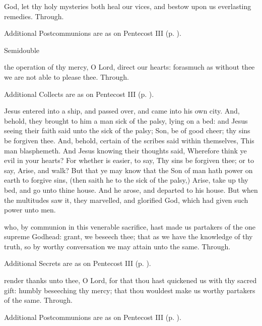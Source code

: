 \postcommunion
{} God, let thy holy mysteries both heal our vices, and bestow upon us everlasting remedies. Through.
\begin{rubric}
    Additional Postcommunions are as on Pentecost III (p. \pageref{PentecostIII}).
\end{rubric}

\begin{inhead}
{Semidouble}
\end{inhead}

\collect
{} the operation of thy mercy, O Lord, direct our hearts: forasmuch as without thee we are not able to please thee. Through.
\begin{rubric}
    Additional Collects are as on Pentecost III (p. \pageref{PentecostIII}).
\end{rubric}

 Jesus entered into a ship, and passed over, and came into his own city. And, behold, they brought to him a man sick of the palsy, lying on a bed: and Jesus seeing their faith said unto the sick of the palsy; Son, be of good cheer; thy sins be forgiven thee. And, behold, certain of the scribes said within themselves, This man blasphemeth. And Jesus knowing their thoughts said, Wherefore think ye evil in your hearts? For whether is easier, to say, Thy sins be forgiven thee; or to say, Arise, and walk? But that ye may know that the Son of man hath power on earth to forgive sins, (then saith he to the sick of the palsy,) Arise, take up thy bed, and go unto thine house. And he arose, and departed to his house. But when the multitudes saw it, they marvelled, and glorified God, which had given such power unto men.

\secret
{} who, by communion in this venerable sacrifice, hast made us partakers of the one supreme Godhead: grant, we beseech thee; that as we have the knowledge of thy truth, so by worthy conversation we may attain unto the same. Through.
\begin{rubric}
    Additional Secrets are as on Pentecost III (p. \pageref{PentecostIII}).
\end{rubric}

\postcommunion
{} render thanks unto thee, O Lord, for that thou hast quickened us with thy sacred gift: humbly beseeching thy mercy; that thou wouldest make us worthy partakers of the same. Through.
\begin{rubric}
    Additional Postcommunions are as on Pentecost III (p. \pageref{PentecostIII}).
\end{rubric}


